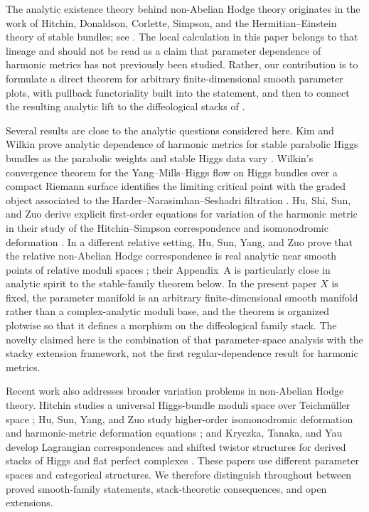 \documentclass[11pt,reqno]{amsart}
\theoremstyle{definition}
\theoremstyle{remark}
\begin{document}
The analytic existence theory behind non-Abelian Hodge theory originates in the work of Hitchin, Donaldson, Corlette, Simpson, and the Hermitian--Einstein theory of stable bundles; see \cite{Hitchin1987,Donaldson1987,Corlette1988,Simpson1988,Simpson1992,UhlenbeckYau1986}.  The local calculation in this paper belongs to that lineage and should not be read as a claim that parameter dependence of harmonic metrics has not previously been studied.  Rather, our contribution is to formulate a direct theorem for arbitrary finite-dimensional smooth parameter plots, with pullback functoriality built into the statement, and then to connect the resulting analytic lift to the diffeological stacks of \cite{AzamRayan2026}.

Several results are close to the analytic questions considered here.  Kim and Wilkin prove analytic dependence of harmonic metrics for stable parabolic Higgs bundles as the parabolic weights and stable Higgs data vary \cite{KimWilkin2018}.  Wilkin's convergence theorem for the Yang--Mills--Higgs flow on Higgs bundles over a compact Riemann surface identifies the limiting critical point with the graded object associated to the Harder--Narasimhan--Seshadri filtration \cite{Wilkin2008}.  Hu, Shi, Sun, and Zuo derive explicit first-order equations for variation of the harmonic metric in their study of the Hitchin--Simpson correspondence and isomonodromic deformation \cite{HuShiSunZuo2025}.  In a different relative setting, Hu, Sun, Yang, and Zuo prove that the relative non-Abelian Hodge correspondence is real analytic near smooth points of relative moduli spaces \cite{HuSunYangZuo2026Relative}; their Appendix~A is particularly close in analytic spirit to the stable-family theorem below.  In the present paper $X$ is fixed, the parameter manifold is an arbitrary finite-dimensional smooth manifold rather than a complex-analytic moduli base, and the theorem is organized plotwise so that it defines a morphism on the diffeological family stack.  The novelty claimed here is the combination of that parameter-space analysis with the stacky extension framework, not the first regular-dependence result for harmonic metrics.

Recent work also addresses broader variation problems in non-Abelian Hodge theory.  Hitchin studies a universal Higgs-bundle moduli space over Teichm\"uller space \cite{Hitchin2026Universal}; Hu, Sun, Yang, and Zuo study higher-order isomonodromic deformation and harmonic-metric deformation equations \cite{HuSunYangZuo2026}; and Kryczka, Tanaka, and Yau develop Lagrangian correspondences and shifted twistor structures for derived stacks of Higgs and flat perfect complexes \cite{KryczkaTanakaYau2026}.  These papers use different parameter spaces and categorical structures.  We therefore distinguish throughout between proved smooth-family statements, stack-theoretic consequences, and open extensions.
\end{document}
